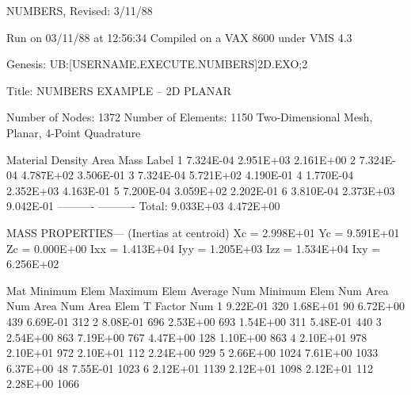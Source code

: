      NUMBERS, Revised:  3/11/88

     Run on 03/11/88 at 12:56:34
     Compiled on a VAX 8600 under VMS 4.3

     Genesis: UB:[USERNAME.EXECUTE.NUMBERS]2D.EXO;2

     Title:   NUMBERS EXAMPLE -- 2D PLANAR

     Number of Nodes:      1372
     Number of Elements:   1150
     Two-Dimensional Mesh, Planar, 4-Point Quadrature

     Material    Density         Area           Mass        Label
         1      7.324E-04      2.951E+03      2.161E+00                     
         2      7.324E-04      4.787E+02      3.506E-01                     
         3      7.324E-04      5.721E+02      4.190E-01                     
         4      1.770E-04      2.352E+03      4.163E-01                     
         5      7.200E-04      3.059E+02      2.202E-01                     
         6      3.810E-04      2.373E+03      9.042E-01                     
                              ----------     ----------
                  Total:       9.033E+03      4.472E+00

     MASS PROPERTIES--- (Inertias at centroid)
      Xc =  2.998E+01   Yc =  9.591E+01   Zc =  0.000E+00
     Ixx =  1.413E+04  Iyy =  1.205E+03  Izz =  1.534E+04
     Ixy =  6.256E+02

     Mat  Minimum   Elem   Maximum   Elem   Average   Num    Minimum   Elem
     Num    Area    Num      Area    Num      Area    Elem   T Factor  Num
      1   9.22E-01   320   1.68E+01    90   6.72E+00   439   6.69E-01   312
      2   8.08E-01   696   2.53E+00   693   1.54E+00   311   5.48E-01   440
      3   2.54E+00   863   7.19E+00   767   4.47E+00   128   1.10E+00   863
      4   2.10E+01   978   2.10E+01   972   2.10E+01   112   2.24E+00   929
      5   2.66E+00  1024   7.61E+00  1033   6.37E+00    48   7.55E-01  1023
      6   2.12E+01  1139   2.12E+01  1098   2.12E+01   112   2.28E+00  1066
